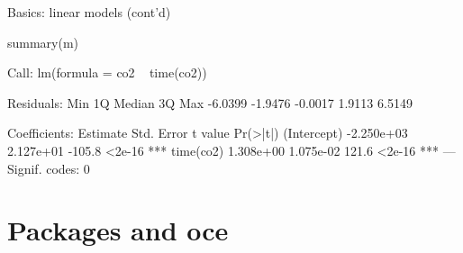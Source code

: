 \documentclass{beamer}
\begin{document}
\begin{frame}[fragile]{Basics: linear models (cont'd)}
  
\begin{Schunk}
\begin{Sinput}
 summary(m)
\end{Sinput}
\begin{Soutput}
Call:
lm(formula = co2 ~ time(co2))

Residuals:
    Min      1Q  Median      3Q     Max 
-6.0399 -1.9476 -0.0017  1.9113  6.5149 

Coefficients:
              Estimate Std. Error t value Pr(>|t|)    
(Intercept) -2.250e+03  2.127e+01  -105.8   <2e-16 ***
time(co2)    1.308e+00  1.075e-02   121.6   <2e-16 ***
---
Signif. codes:  0 
\end{Soutput}
\end{Schunk}
  
\end{frame}

\section{Packages and oce}
\end{document}
